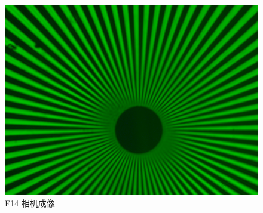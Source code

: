 \documentclass{ctexart}
\begin{document}
\begin{figure}[H]
\begin{minipage}[b]{0.3\textwidth}
    \includegraphics[width=\textwidth]{pictures/F14-mask1-Ex22.png}
    \caption{F14 相机成像}
  \end{minipage}
\end{figure}
\end{document}

